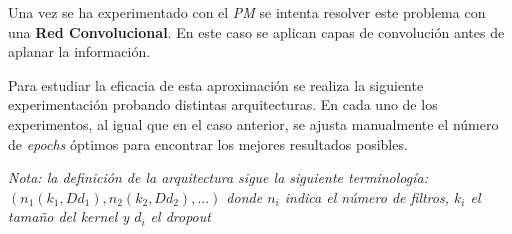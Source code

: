 \documentclass{uc3mpracticas}
\begin{document}
Una vez se ha experimentado con el \textit{PM} se intenta resolver este problema con una \textbf{Red Convolucional}. En este caso se aplican capas de convolución antes de aplanar la información.

\vspace{2mm}

Para estudiar la eficacia de esta aproximación se realiza la siguiente experimentación probando distintas arquitecturas. En cada uno de los experimentos, al igual que en el caso anterior, se ajusta manualmente el número de \textit{epochs} óptimos para encontrar los mejores resultados posibles.


\vspace{3mm}

\textit{Nota: la definición de la arquitectura sigue la siguiente terminología: $(n_1(k_1, Dd_1), n_2(k_2, Dd_2), ...)$ donde $n_i$ indica el número de filtros, $k_i$ el tamaño del kernel y $d_i$ el dropout}

\newpage
\end{document}
